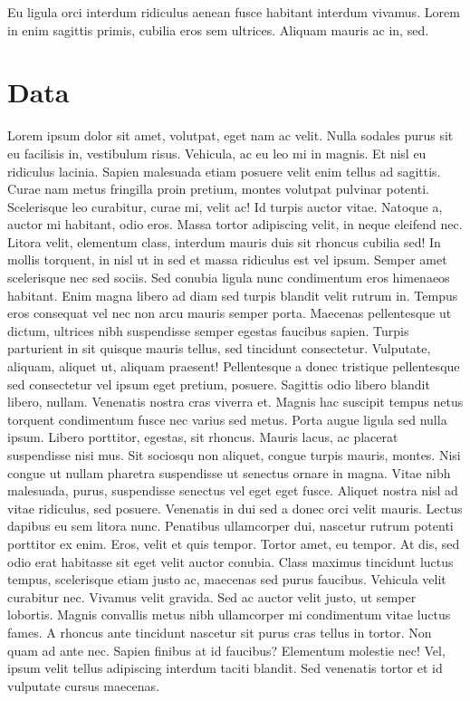 \documentclass[
  12pt,
]{article}
\begin{document}
Eu ligula orci interdum ridiculus aenean fusce habitant interdum vivamus. Lorem in enim sagittis primis, cubilia eros sem ultrices. Aliquam mauris ac in, sed.

\hypertarget{data}{%
\section{Data}\label{data}}

Lorem ipsum dolor sit amet, volutpat, eget nam ac velit. Nulla sodales purus sit eu facilisis in, vestibulum risus. Vehicula, ac eu leo mi in magnis. Et nisl eu ridiculus lacinia. Sapien malesuada etiam posuere velit enim tellus ad sagittis. Curae nam metus fringilla proin pretium, montes volutpat pulvinar potenti. Scelerisque leo curabitur, curae mi, velit ac! Id turpis auctor vitae. Natoque a, auctor mi habitant, odio eros. Massa tortor adipiscing velit, in neque eleifend nec. Litora velit, elementum class, interdum mauris duis sit rhoncus cubilia sed! In mollis torquent, in nisl ut in sed et massa ridiculus est vel ipsum. Semper amet scelerisque nec sed sociis. Sed conubia ligula nunc condimentum eros himenaeos habitant. Enim magna libero ad diam sed turpis blandit velit rutrum in. Tempus eros consequat vel nec non arcu mauris semper porta. Maecenas pellentesque ut dictum, ultrices nibh suspendisse semper egestas faucibus sapien. Turpis parturient in sit quisque mauris tellus, sed tincidunt consectetur. Vulputate, aliquam, aliquet ut, aliquam praesent! Pellentesque a donec tristique pellentesque sed consectetur vel ipsum eget pretium, posuere. Sagittis odio libero blandit libero, nullam. Venenatis nostra cras viverra et. Magnis hac suscipit tempus netus torquent condimentum fusce nec varius sed metus. Porta augue ligula sed nulla ipsum. Libero porttitor, egestas, sit rhoncus. Mauris lacus, ac placerat suspendisse nisi mus. Sit sociosqu non aliquet, congue turpis mauris, montes. Nisi congue ut nullam pharetra suspendisse ut senectus ornare in magna. Vitae nibh malesuada, purus, suspendisse senectus vel eget eget fusce. Aliquet nostra nisl ad vitae ridiculus, sed posuere. Venenatis in dui sed a donec orci velit mauris. Lectus dapibus eu sem litora nunc. Penatibus ullamcorper dui, nascetur rutrum potenti porttitor ex enim. Eros, velit et quis tempor. Tortor amet, eu tempor. At dis, sed odio erat habitasse sit eget velit auctor conubia. Class maximus tincidunt luctus tempus, scelerisque etiam justo ac, maecenas sed purus faucibus. Vehicula velit curabitur nec. Vivamus velit gravida. Sed ac auctor velit justo, ut semper lobortis. Magnis convallis metus nibh ullamcorper mi condimentum vitae luctus fames. A rhoncus ante tincidunt nascetur sit purus cras tellus in tortor. Non quam ad ante nec. Sapien finibus at id faucibus? Elementum molestie nec! Vel, ipsum velit tellus adipiscing interdum taciti blandit. Sed venenatis tortor et id vulputate cursus maecenas.
\end{document}
